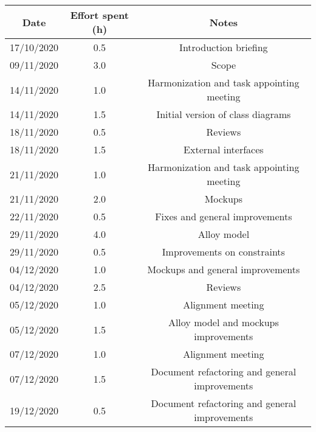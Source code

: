 \documentclass[../../main.tex]{subfiles}
\begin{document}
\begin{center}
    \begin{tabular}{|c| |c| |c|} 
        \hline
        Date & Effort spent (h) & Notes\\ [0.5ex] 
        \hline\hline
        17/10/2020 & 0.5 & Introduction briefing\\ 
        09/11/2020 & 3.0 & Scope\\ 
        14/11/2020 & 1.0 & Harmonization and task appointing meeting\\
        14/11/2020 & 1.5 & Initial version of class diagrams\\
        18/11/2020 & 0.5 & Reviews\\
        18/11/2020 & 1.5 & External interfaces\\
        21/11/2020 & 1.0 & Harmonization and task appointing meeting\\
        21/11/2020 & 2.0 & Mockups\\
        22/11/2020 & 0.5 & Fixes and general improvements\\
        29/11/2020 & 4.0 & Alloy model\\
        29/11/2020 & 0.5 & Improvements on constraints\\
        04/12/2020 & 1.0 & Mockups and general improvements\\
        04/12/2020 & 2.5 & Reviews\\
        05/12/2020 & 1.0 & Alignment meeting\\
        05/12/2020 & 1.5 & Alloy model and mockups improvements\\
        07/12/2020 & 1.0 & Alignment meeting\\
        07/12/2020 & 1.5 & Document refactoring and general improvements\\
        19/12/2020 & 0.5 & Document refactoring and general improvements\\
        \hline
    \end{tabular}
\end{center}
\end{document}
